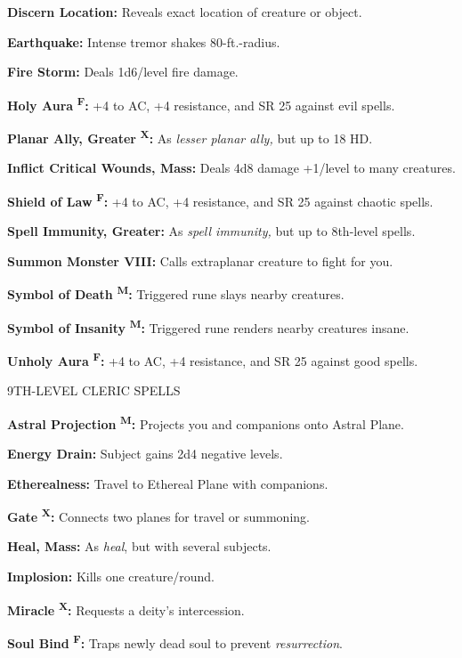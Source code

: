 \documentclass{article}
\begin{document}
\textbf{Discern Location:} Reveals exact location of creature or object.

\textbf{Earthquake:} Intense tremor shakes 80-ft.-radius.

\textbf{Fire Storm:} Deals 1d6/level fire damage.

\textbf{Holy Aura }\textsuperscript{\textbf{F}}\textbf{:} +4 to AC, +4 resistance, 
and SR 25 against evil spells.

\textbf{Planar Ally, Greater }\textsuperscript{\textbf{X}}\textbf{:} As \textit{lesser 
planar ally, }but up to 18 HD.

\textbf{Inflict Critical Wounds, Mass:} Deals 4d8 damage +1/level to many creatures.

\textbf{Shield of Law }\textsuperscript{\textbf{F}}\textbf{:} +4 to AC, +4 resistance, 
and SR 25 against chaotic spells.

\textbf{Spell Immunity, Greater:} As \textit{spell immunity, }but up to 8th-level 
spells.

\textbf{Summon Monster VIII:} Calls extraplanar creature to fight for you.

\textbf{Symbol of Death }\textsuperscript{\textbf{M}}\textbf{:} Triggered rune 
slays nearby creatures.

\textbf{Symbol of Insanity }\textsuperscript{\textbf{M}}\textbf{:} Triggered rune 
renders nearby creatures insane.

\textbf{Unholy Aura }\textsuperscript{\textbf{F}}\textbf{:} +4 to AC, +4 resistance, 
and SR 25 against good spells.

9TH-LEVEL CLERIC SPELLS

\textbf{Astral Projection }\textsuperscript{\textbf{M}}\textbf{:} Projects you 
and companions onto Astral Plane.

\textbf{Energy Drain:} Subject gains 2d4 negative levels.

\textbf{Etherealness:} Travel to Ethereal Plane with companions.

\textbf{Gate }\textsuperscript{\textbf{X}}\textbf{:} Connects two planes for travel 
or summoning.

\textbf{Heal, Mass:} As \textit{heal}, but with several subjects.

\textbf{Implosion:} Kills one creature/round.

\textbf{Miracle }\textsuperscript{\textbf{X}}\textbf{:} Requests a deity's intercession.

\textbf{Soul Bind }\textsuperscript{\textbf{F}}\textbf{:} Traps newly dead soul 
to prevent \textit{resurrection}.
\end{document}

